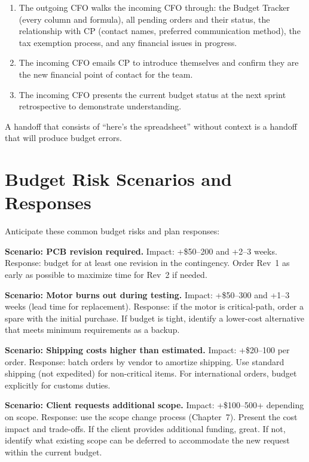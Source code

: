 \begin{enumerate}[nosep,leftmargin=1.5em]
\item The outgoing CFO walks the incoming CFO through: the Budget Tracker (every column and formula), all pending orders and their status, the relationship with CP (contact names, preferred communication method), the tax exemption process, and any financial issues in progress.
\item The incoming CFO emails CP to introduce themselves and confirm they are the new financial point of contact for the team.
\item The incoming CFO presents the current budget status at the next sprint retrospective to demonstrate understanding.
\end{enumerate}

A handoff that consists of ``here's the spreadsheet'' without context is a handoff that will produce budget errors.



\section{Budget Risk Scenarios and Responses}
Anticipate these common budget risks and plan responses:

\textbf{Scenario: PCB revision required.} Impact: +\$50--200 and +2--3 weeks. Response: budget for at least one revision in the contingency. Order Rev~1 as early as possible to maximize time for Rev~2 if needed.

\textbf{Scenario: Motor burns out during testing.} Impact: +\$50--300 and +1--3 weeks (lead time for replacement). Response: if the motor is critical-path, order a spare with the initial purchase. If budget is tight, identify a lower-cost alternative that meets minimum requirements as a backup.

\textbf{Scenario: Shipping costs higher than estimated.} Impact: +\$20--100 per order. Response: batch orders by vendor to amortize shipping. Use standard shipping (not expedited) for non-critical items. For international orders, budget explicitly for customs duties.

\textbf{Scenario: Client requests additional scope.} Impact: +\$100--500+ depending on scope. Response: use the scope change process (Chapter~7). Present the cost impact and trade-offs. If the client provides additional funding, great. If not, identify what existing scope can be deferred to accommodate the new request within the current budget.


